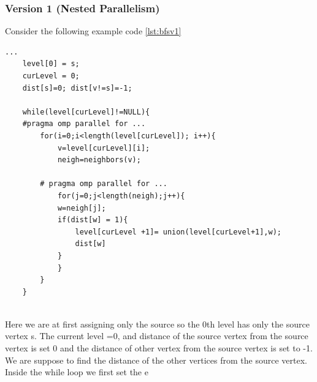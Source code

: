 \documentclass[12pt]{article}
\begin{document}
\subsubsection{Version 1 (Nested Parallelism)}
Consider the following example code \ref{lst:bfsv1}
\begin{lstlisting}[caption={BFS-Example},captionpos=b,label={lst:bfsv1}]
...
    level[0] = s;
    curLevel = 0;
    dist[s]=0; dist[v!=s]=-1;

    while(level[curLevel]!=NULL){
    #pragma omp parallel for ...
        for(i=0;i<length(level[curLevel]); i++){
            v=level[curLevel][i];
            neigh=neighbors(v);

        # pragma omp parallel for ...
            for(j=0;j<length(neigh);j++){
            w=neigh[j];
            if(dist[w] = 1){
                level[curLevel +1]= union(level[curLevel+1],w);
                dist[w] 
            }
            }
        }
    }
    
\end{lstlisting}
Here we are at first assigning only the source so the 0th level has only the source vertex s. The current level =0, and distance of the source vertex from the source vertex is set 0 and the distance of other vertex from the source vertex is set to -1. We are suppose to find the distance of the other vertices from the source vertex. 
Inside the while loop we first set the e















    









\newpage
\end{document}
